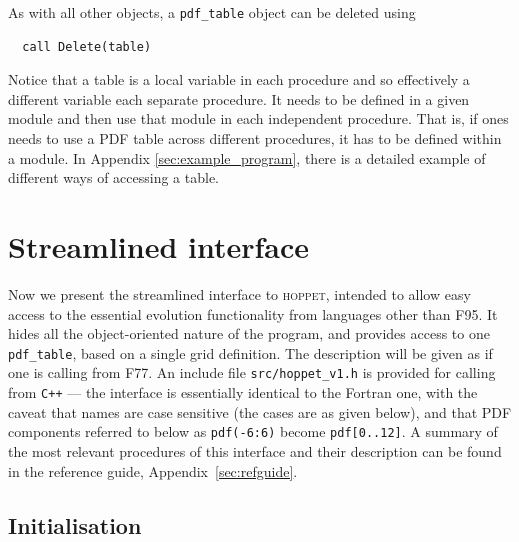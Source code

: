 \documentclass[12pt]{article}
\newcommand{\hoppet}{\textsc{hoppet}\xspace}
\newcommand{\ttt}[1]{\texttt{#1}}
\begin{document}
As with all other objects, a \ttt{pdf\_table} object can be deleted
using
\begin{lstlisting}
  call Delete(table) 
\end{lstlisting}
Notice that a table is a local variable in each procedure and so 
effectively a different variable each separate
procedure. It needs to be defined
in a given module and then use that module in each
independent procedure. That is, if ones needs to use a 
PDF table across different procedures, it has to be 
defined within a module.
In Appendix \ref{sec:example_program}, 
there is a detailed example of different ways of
accessing a table. 






\section{Streamlined interface}
\label{sec:vanilla}

Now we present the streamlined interface to \hoppet,
intended to allow easy access
to the essential evolution functionality from languages other than
F95.  It hides all the object-oriented nature of the program, and
provides access to one \ttt{pdf\_table}, based on a single grid
definition. The description will be given as if one is calling from
F77. An include file \ttt{src/hoppet\_v1.h} is provided for calling
from {\tt C++} --- the interface is essentially identical to the Fortran
one, with the caveat that names are case sensitive (the cases are as
given below), and that PDF components referred to below as
\ttt{pdf(-6:6)} become \ttt{pdf[0..12]}. A summary of the
most relevant procedures of this interface 
and their description can be found 
in the reference guide, Appendix~\ref{sec:refguide}.

\subsection{Initialisation}
\label{sec:vanilla_initialisation}
\end{document}

